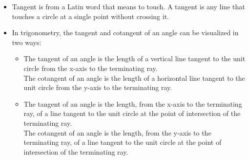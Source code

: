\documentclass[12pt]{article}
\begin{document}
\begin{itemize}
\item Tangent is from a Latin word that means to touch. A tangent is any line that touches a circle at a single point without crossing it.
\item In trigonometry, the tangent and cotangent of an angle can be visualized in two ways:
\begin{itemize}
    \item The tangent of an angle is the length of a vertical line tangent to the unit circle from the x-axis to the terminating ray.\\
    The cotangent of an angle is the length of a horizontal line tangent to the unit circle from the y-axis to the terminating ray.\\
    \item The tangent of an angle is the length, from the x-axis to the terminating ray, of a line tangent to the unit circle at the point of intersection of the terminating ray.\\
    The cotangent of an angle is the length, from the y-axis to the terminating ray, of a line tangent to the unit circle at the point of intersection of the terminating ray.
\end{itemize}
\end{itemize}
\begin{minipage}{0.5\textwidth}
\end{minipage}
\hfill
\begin{minipage}{0.5\textwidth}
\end{minipage}
\end{document}
